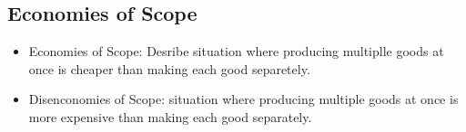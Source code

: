 \documentclass{article}
\begin{document}
\subsection{Economies of Scope}
\begin{itemize}
  \item Economies of Scope: Desribe situation where producing multiplle goods at once is cheaper
    than making each good separetely.
  \item Disenconomies of Scope: situation where producing multiple goods at once is more expensive
    than making each good separately.
\end{itemize}
\end{document}

